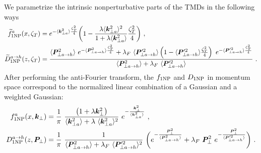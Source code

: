 \documentclass[aps,preprintnumbers,showpacs,nofootinbib,superscriptaddress,floatfix]{revtex4}
\newcommand{\T}{\perp}
\newcommand{\bT}{\zeta_T}
\begin{document}
We parametrize the intrinsic nonperturbative parts of the TMDs in the
following ways
\begin{align}
\widetilde{f}_{1 {\rm NP}}^a (x, \bT) &= e^{-\langle \bm{k}_{\T a}^2 \rangle \frac{\bT^2}{4}}
        \bigg( 1 - \frac{\lambda \langle \bm{k}_{\T a}^2 \rangle^2}{1+\lambda\langle \bm{k}_{\T a}^2 \rangle}  \frac{\bT^2}{4} \bigg)\  ,
\label{e:f1NP} \\
\widetilde{D}_{1 {\rm NP}}^{a \to h} (z, \bT) &= 
    \frac{ \langle \bm{P}_{\T a\to h}^2 \rangle \   e^{-\langle \bm{P}_{\T a\to h}^2 \rangle \frac{\bT^2}{4}}
        + \lambda_F \   \langle \bm{P}_{\T a\to h}'^2 \rangle \left( 1 - \langle \bm{P}_{\T a\to h}'^2 \rangle \frac{\bT^2}{4} \right)
         \  e^{- \langle \bm{P}_{\T a\to h}'^2 \rangle \frac{\bT^2}{4}}}
     {\langle \bm{P}_{\T a\to h}^2 \rangle + \lambda_F\   \langle \bm{P}_{\T a\to h}'^2 \rangle} \  .
\label{e:D1NP}
\end{align} 
After performing the anti-Fourier transform, the $f_{1 \rm NP}$ and $D_{1\rm
  NP}$ in momentum space correspond to the normalized linear combination of
a Gaussian and a weighted Gaussian:
\begin{align} 
f_{1 {\rm NP}}^a (x, \bm{k}_{\T}) &= \frac{1}{\pi} \  
                        \frac{\big( 1 +\lambda \bm{k}_{\T}^2\big)}
                                {\langle \bm{k}_{\T a}^2 \rangle +\lambda \  \langle \bm{k}_{\T a}^2 \rangle^2}
                        \  e^{- \frac{\bm{k}_{\T}^2}{\langle \bm{k}_{\T a}^2 \rangle}} \  ,
\label{e:f1NPk}   \\
D_{1 {\rm NP}}^{a\to h} (z, \bm{P}_{\T}) &=  \frac{1}{\pi} \   
                       \frac{1}{\langle \bm{P}_{\T a\to h}^2 \rangle + \lambda_F \  \langle \bm{P}_{\T a\to h}'^2 \rangle^2}
                \   \bigg( e^{- \frac{\bm{P}_{\T}^2}{\langle \bm{P}_{\T a\to h}^2 \rangle}}
                              + \lambda_F \  \bm{P}_{\T}^2 \  e^{- \frac{\bm{P}_{\T}^2}{\langle \bm{P}_{\T a\to h}'^2 \rangle}} \bigg) \  .
\label{e:D1NPk}
\end{align} 
\end{document}
